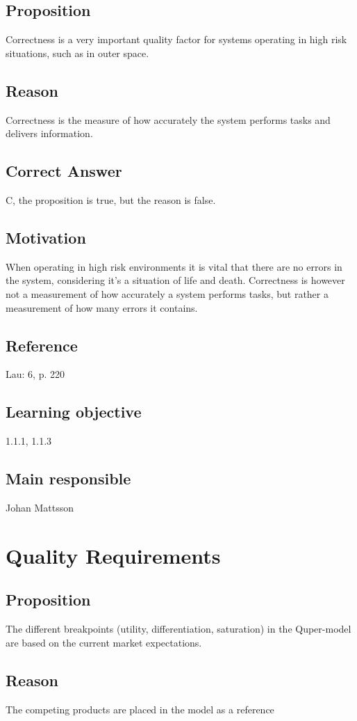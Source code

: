 \documentclass[a4paper]{article}
\begin{document}
\subsection*{Proposition}
Correctness is a very important quality factor for systems operating in high risk situations, such as in outer space.
\subsection*{Reason}
Correctness is the measure of how accurately the system performs tasks and delivers information.
\subsection*{Correct Answer}
C, the proposition is true, but the reason is false.
\subsection*{Motivation}
When operating in high risk environments it is vital that there are no errors in the system, considering it’s a situation of life and death. Correctness is however not a measurement of how accurately a system performs tasks, but rather a measurement of how many errors it contains.
\subsection*{Reference}
Lau: 6, p. 220
\subsection*{Learning objective}
1.1.1, 1.1.3
\subsection*{Main responsible}
Johan Mattsson

\section{Quality Requirements}
\subsection*{Proposition}
The different breakpoints (utility, differentiation, saturation) in the Quper-model are based on the current market expectations.
\subsection*{Reason}
The competing products are placed in the model as a reference
\end{document}
